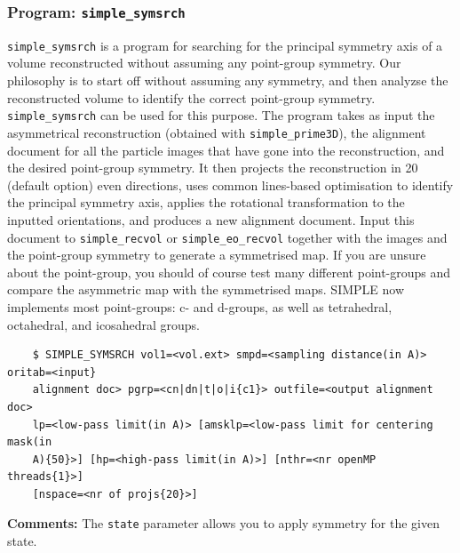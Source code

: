 \documentclass[a4paper,11pt]{article}
\newcommand{\prgname}[1]{\textcolor{NavyBlue}{\texttt{#1}}}
\begin{document}
\subsubsection{Program: \prgname{simple\_symsrch}}
\label{symsrch}
\prgname{simple\_symsrch} is a program for searching for the principal symmetry axis of a volume reconstructed without assuming any point-group symmetry. Our philosophy is to start off without assuming any symmetry, and then analyzse the reconstructed volume to identify the correct point-group symmetry. \prgname{simple\_symsrch} can be used for this purpose. The program takes as input the asymmetrical reconstruction (obtained with \prgname{simple\_prime3D}), the alignment document for all the particle images that have gone into the reconstruction, and the desired point-group symmetry. It then projects the reconstruction in 20 (default option) even directions, uses common lines-based optimisation to identify the principal symmetry axis, applies the rotational transformation to the inputted orientations, and produces a new alignment document. Input this document to \texttt{simple\_recvol} or \texttt{simple\_eo\_recvol} together with the images and the point-group symmetry to generate a symmetrised map. If you are unsure about the point-group, you should of course test many different point-groups and compare the asymmetric map with the symmetrised maps. SIMPLE now implements most point-groups: c- and d-groups, as well as tetrahedral, octahedral, and icosahedral groups.
\begin{verbatim}
    $ SIMPLE_SYMSRCH vol1=<vol.ext> smpd=<sampling distance(in A)> oritab=<input}
    alignment doc> pgrp=<cn|dn|t|o|i{c1}> outfile=<output alignment doc>
    lp=<low-pass limit(in A)> [amsklp=<low-pass limit for centering mask(in
    A){50}>] [hp=<high-pass limit(in A)>] [nthr=<nr openMP threads{1}>]
    [nspace=<nr of projs{20}>]
\end{verbatim}
\noindent\textbf{Comments:} The \texttt{state} parameter allows you to apply symmetry for the given state.
\end{document}
